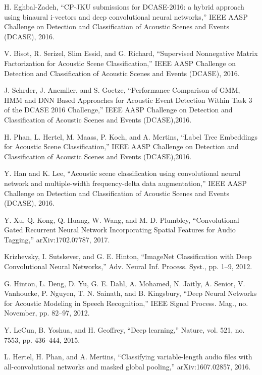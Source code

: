 \documentclass[conference]{IEEEtran}
\begin{document}
\begin{thebibliography}{00}
	H. Eghbal-Zadeh, ``CP-JKU submissions for DCASE-2016: a hybrid approach using binaural i-vectors and deep convolutional neural networks,'' IEEE AASP Challenge on Detection and Classification of Acoustic Scenes and Events (DCASE), 2016.

 V. Bisot, R. Serizel, Slim Essid, and G. Richard, ``Supervised Nonnegative Matrix Factorization for Acoustic Scene Classification,'' IEEE AASP Challenge on Detection and Classification of Acoustic Scenes and Events (DCASE), 2016.

 J. Schrder, J. Anemller, and S. Goetze, ``Performance Comparison of GMM, HMM and DNN Based Approaches for Acoustic Event Detection Within Task 3 of the DCASE 2016 Challenge,'' IEEE AASP Challenge on Detection and Classification of Acoustic Scenes and Events (DCASE),2016.

 H. Phan, L. Hertel, M. Maass, P. Koch, and A. Mertins, ``Label Tree Embeddings for Acoustic Scene Classification,'' IEEE AASP Challenge on Detection and Classification of Acoustic Scenes and Events (DCASE),2016.

 Y. Han and K. Lee, ``Acoustic scene classification using convolutional neural network and multiple-width frequency-delta data augmentation,'' IEEE AASP Challenge on Detection and Classification of Acoustic Scenes and Events (DCASE), 2016.

 Y. Xu, Q. Kong, Q. Huang, W. Wang, and M. D. Plumbley, ``Convolutional Gated Recurrent Neural Network Incorporating Spatial Features for Audio Tagging,'' arXiv:1702.07787, 2017.

 Krizhevsky, I. Sutskever, and G. E. Hinton, ``ImageNet Classification with Deep Convolutional Neural Networks,'' Adv. Neural Inf. Process. Syst., pp. 1–9, 2012.

 G. Hinton, L. Deng, D. Yu, G. E. Dahl, A. Mohamed, N. Jaitly, A. Senior, V. Vanhoucke, P. Nguyen, T. N. Sainath, and B. Kingsbury, ``Deep Neural Networks for Acoustic Modeling in Speech Recognition,'' IEEE Signal Process. Mag., no. November, pp. 82–97, 2012.

 Y. LeCun, B. Yoshua, and H. Geoffrey, ``Deep learning,'' Nature, vol. 521, no. 7553, pp. 436–444, 2015.

 L. Hertel, H. Phan, and A. Mertins, ``Classifying variable-length audio files with all-convolutional networks and masked global pooling,'' arXiv:1607.02857, 2016.


\end{thebibliography}
\end{document}

